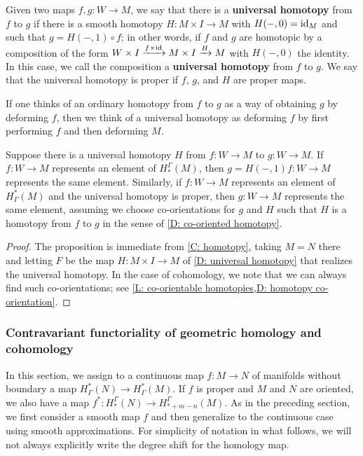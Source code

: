 \begin{definition}\label{D: universal homotopy}
	Given two maps $f,g \colon W\to M$, we say that there is a \textbf{universal homotopy} from $f$ to $g$ if there is a smooth homotopy $H \colon M\times I\to M$ with $H(-,0)=\mathrm{id}_M$ and such that $g=H(-,1)\circ f$; in other words, if $f$ and $g$ are homotopic by a composition of the form $W \times I \xrightarrow{f\times \mathrm{id}} M \times I \xrightarrow{H} M$ with $H(-,0)$ the identity. In this case, we call the composition a \textbf{universal homotopy} from $f$ to $g$. We say that the universal homotopy is proper if $f$, $g$, and $H$ are proper maps.
\end{definition}

If one thinks of an ordinary homotopy from $f$ to $g$ as a way of obtaining $g$ by deforming $f$, then we think of a universal homotopy as deforming $f$ by first performing $f$ and then deforming $M$.


\begin{proposition}\label{P: universal homotopy}
	Suppose there is a universal homotopy $H$ from $f \colon W\to M$ to $g \colon W\to M$. If $f \colon W\to M$ represents an element of $H_*^\Gamma(M)$, then $g = H(-,1)f \colon W\to M$ represents the same element. Similarly, if $f \colon W\to M$ represents an element of $H^*_\Gamma(M)$ and the universal homotopy is proper, then $g \colon W\to M$ represents the same element, assuming we choose co-orientations for $g$ and $H$ such that $H$ is a homotopy from $f$ to $g$ in the sense of \cref{D: co-oriented homotopy}.
\end{proposition}

\begin{proof}
	The proposition is immediate from \cref{C: homotopy}, taking $M=N$ there and letting $F$ be the map $H \colon M \times I \to M$ of \cref {D: universal homotopy} that realizes the universal homotopy. In the case of cohomology, we note that we can always find such co-orientations; see \cref{L: co-orientable homotopies,D: homotopy co-orientation}.
\end{proof}

\subsubsection{Contravariant functoriality of geometric homology and cohomology}\label{S: cohomology pullback}

In this section, we assign to a continuous map $f \colon M \to N$ of manifolds without boundary a map $H^*_\Gamma(N) \to H^*_\Gamma(M)$.
If $f$ is proper and $M$ and $N$ are oriented, we also have a map $f^* \colon H_*^\Gamma(N) \to H_{*+m-n}^\Gamma(M)$.
As in the preceding section, we first consider a smooth map $f$ and then generalize to the continuous case using smooth approximations.
For simplicity of notation in what follows, we will not always explicitly write the degree shift for the homology map.

